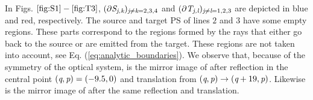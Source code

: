 \indent In Figs. $\ref{fig:S1}-\ref{fig:T3}$,  $(\partial \mbox{$\emph{S}_{\textit{\textit{j},\textit{k}}}$})_{\textit{\textit{j}}\neq\textit{\textit{k}}=2, 3, 4}$ and $(\partial \mbox{$\emph{T}_{\textit{\textit{j},\textit{l}}}$})_{\textit{\textit{j}}\neq\textit{\textit{l}}=1, 2, 3}$ are depicted in blue and red, respectively. The source and target PS of lines $2$ and $3$ have some empty regions. 
These parts correspond to the regions formed by the rays that either go back to the source or are emitted from the target. These regions are not taken into account, see Eq. (\ref{eq:analytic_boundaries}). We observe that, because of the symmetry of the optical system,  is the mirror image of  after reflection in the central point 
$(\textit{q}, \textit{p}) = (-9.5, 0)$ and translation from $(\textit{q}, \textit{p})\rightarrow(\textit{q}+19, \textit{p})$. Likewise  is the mirror image of  after the same reflection and translation.
